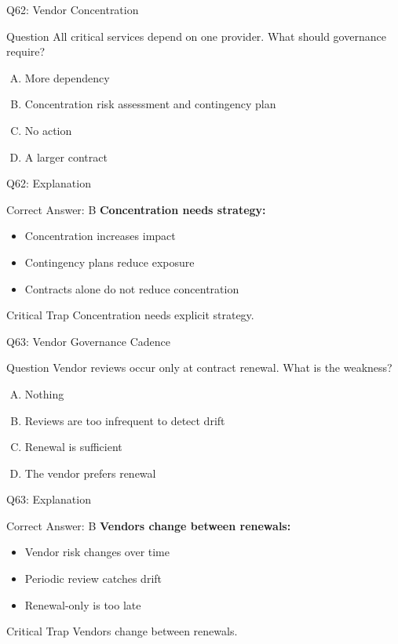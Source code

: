 \documentclass{beamer}
\begin{document}
	\begin{frame}{Q62: Vendor Concentration}
		\begin{block}{Question}
			All critical services depend on one provider. What should governance require?
		\end{block}
		\begin{enumerate}[(A)]
			\item More dependency
			\item Concentration risk assessment and contingency plan
			\item No action
			\item A larger contract
		\end{enumerate}
	\end{frame}
	
	\begin{frame}{Q62: Explanation}
		\begin{block}{Correct Answer: B}
			\textbf{Concentration needs strategy:}
			\begin{itemize}
				\item Concentration increases impact
				\item Contingency plans reduce exposure
				\item Contracts alone do not reduce concentration
			\end{itemize}
		\end{block}
		\begin{alertblock}{Critical Trap}
			Concentration needs explicit strategy.
		\end{alertblock}
	\end{frame}
	
	\begin{frame}{Q63: Vendor Governance Cadence}
		\begin{block}{Question}
			Vendor reviews occur only at contract renewal. What is the weakness?
		\end{block}
		\begin{enumerate}[(A)]
			\item Nothing
			\item Reviews are too infrequent to detect drift
			\item Renewal is sufficient
			\item The vendor prefers renewal
		\end{enumerate}
	\end{frame}
	
	\begin{frame}{Q63: Explanation}
		\begin{block}{Correct Answer: B}
			\textbf{Vendors change between renewals:}
			\begin{itemize}
				\item Vendor risk changes over time
				\item Periodic review catches drift
				\item Renewal-only is too late
			\end{itemize}
		\end{block}
		\begin{alertblock}{Critical Trap}
			Vendors change between renewals.
		\end{alertblock}
	\end{frame}
	
\end{document}
